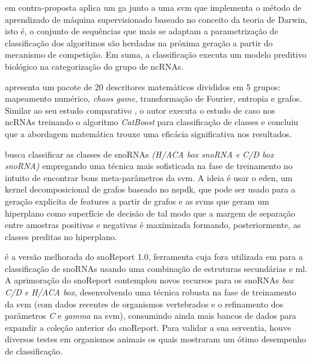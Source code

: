 \cite{ga-svm} em contra-proposta aplica um \ac{ga} junto a uma \ac{svm} que implementa o método de aprendizado de máquina supervisionado baseado no conceito da teoria de Darwin, isto é, o conjunto de sequências que mais se adaptam a parametrização de classificação dos algoritmos são herdadas na próxima geração a partir do mecanismo de competição. Em suma, a classificação executa um modelo preditivo biológico na categorização do grupo de ncRNAs.

\cite{math-features-package} apresenta um pacote de 20 descritores matemáticos divididos em 5 grupos: mapeamento numérico, \textit{chaos game}, transformação de Fourier, entropia e grafos. Similar ao seu estudo comparativo \cite{math-feature-bio}, o autor executa o estudo de caso nos ncRNAs treinando o algoritmo \textit{CatBoost} para classificação de classes e concluiu que a abordagem matemática trouxe uma eficácia significativa nos resultados.

\cite{snoRNAs-article} busca classificar as classes de snoRNAs \textit{(H/ACA box snoRNA e C/D box snoRNA)} empregando uma técnica mais sofisticada na fase de treinamento no intuito de encontrar bons meta-parâmetros da \ac{svm}. A ideia é usar o \ac{eden}, um kernel decomposicional de grafos baseado no \ac{nspdk}, que pode ser usado para a geração explicita de features a partir de grafos e as \ac{svm}s que geram um hiperplano como superfície de decisão de tal modo que a margem de separação entre amostras positivas e negativas é maximizada formando, posteriormente, as classes preditas no hiperplano. 

\cite{snoReport-article} é a versão melhorada do snoReport 1.0, ferramenta cuja fora utilizada em \cite{snoRNAs-article} para a classificação de snoRNAs usando uma combinação de estruturas secundárias e \ac{ml}. A aprimoração do snoReport contemplou novos recursos para os snoRNAs \textit{box C/D e H/ACA box}, desenvolvendo uma técnica robusta na fase de treinamento da \ac{svm} (com dados recentes de organismos vertebrados e o refinamento dos parâmetros \textit{C} e \textit{gamma} na \ac{svm}), consumindo ainda mais bancos de dados para expandir a coleção anterior do snoReport. Para validar a sua serventia, houve diversos testes em organismos animais os quais mostraram um ótimo desempenho de classificação.

